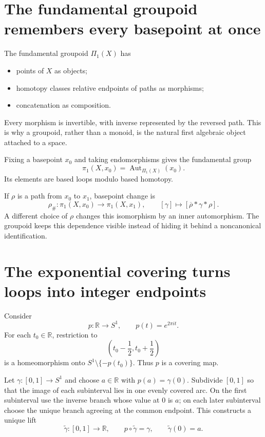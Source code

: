 \section{The fundamental groupoid remembers every basepoint at once}

The fundamental groupoid \(\Pi_1(X)\) has
\begin{itemize}
  \item points of \(X\) as objects;
  \item homotopy classes relative endpoints of paths as morphisms;
  \item concatenation as composition.
\end{itemize}
Every morphism is invertible, with inverse represented by the reversed path.  This is why a groupoid, rather than a monoid, is the natural first algebraic object attached to a space.

Fixing a basepoint \(x_0\) and taking endomorphisms gives the fundamental group
\[
  \pi_1(X,x_0)
  =\operatorname{Aut}_{\Pi_1(X)}(x_0).
\]
Its elements are based loops modulo based homotopy.

If \(\rho\) is a path from \(x_0\) to \(x_1\), basepoint change is
\[
  \rho_\#:\pi_1(X,x_0)\to\pi_1(X,x_1),
  \qquad
  [\gamma]\longmapsto
  [\overline\rho*\gamma*\rho].
\]
A different choice of \(\rho\) changes this isomorphism by an inner automorphism.  The groupoid keeps this dependence visible instead of hiding it behind a noncanonical identification.

\section{The exponential covering turns loops into integer endpoints}

Consider
\[
  p:\mathbb R\to S^1,
  \qquad
  p(t)=e^{2\pi i t}.
\]
For each \(t_0\in\mathbb R\), restriction to
\[
  \left(t_0-\frac12,t_0+\frac12\right)
\]
is a homeomorphism onto \(S^1\setminus\{-p(t_0)\}\).  Thus \(p\) is a covering map.

Let \(\gamma:[0,1]\to S^1\) and choose \(a\in\mathbb R\) with \(p(a)=\gamma(0)\).  Subdivide \([0,1]\) so that the image of each subinterval lies in one evenly covered arc.  On the first subinterval use the inverse branch whose value at \(0\) is \(a\); on each later subinterval choose the unique branch agreeing at the common endpoint.  This constructs a unique lift
\[
  \widetilde\gamma:[0,1]\to\mathbb R,
  \qquad
  p\circ\widetilde\gamma=\gamma,
  \qquad
  \widetilde\gamma(0)=a.
\]

